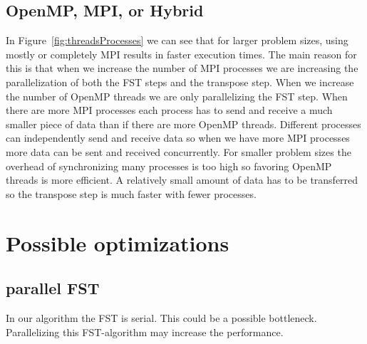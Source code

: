 \documentclass{article}
\begin{document}
\subsection{OpenMP, MPI, or Hybrid}

	In Figure~\ref{fig:threadsProcesses} we can see that for larger problem sizes, using mostly or completely MPI results in faster execution times. The main reason for this is that when we increase the number of MPI processes we are increasing the parallelization of both the FST steps and the transpose step. When we increase the number of OpenMP threads we are only parallelizing the FST step. When there are more MPI processes each process has to send and receive a much smaller piece of data than if there are more OpenMP threads. Different processes can independently send and receive data so when we have more MPI processes more data can be sent and received concurrently. For smaller problem sizes the overhead of synchronizing many processes is too high so favoring OpenMP threads is more efficient. A relatively small amount of data has to be transferred so the transpose step is much faster with fewer processes.





\section{Possible optimizations}
\subsection{parallel FST}
In our algorithm the FST is serial. This could be a possible bottleneck. Parallelizing this FST-algorithm may increase the performance.
\end{document}
